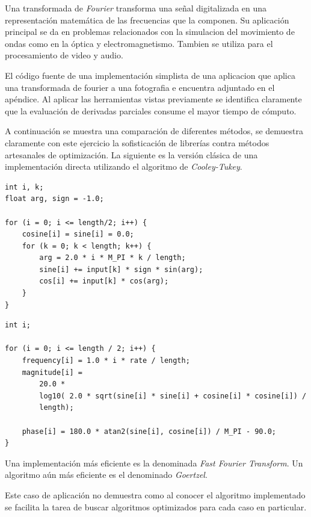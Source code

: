 \documentclass[a4paper]{report}
\begin{document}
Una transformada de {\it Fourier} \cite{fourier} transforma una se\~nal
digitalizada en una representaci\'on matem\'atica de las frecuencias que la
componen. Su aplicaci\'on principal se da en problemas relacionados con la simulacion del
movimiento de ondas como en la \'optica y electromagnetismo. Tambien se utiliza para el procesamiento de video y audio.

\bigskip

El c\'odigo fuente de una implementaci\'on simplista de una aplicacion que aplica una transformada de fourier a una fotografia 
e encuentra adjuntado en el ap\'endice. Al aplicar las herramientas vistas previamente se identifica
claramente que la evaluaci\'on de derivadas parciales consume el mayor tiempo
de c\'omputo.

\bigskip

A continuaci\'on se muestra una comparaci\'on de diferentes m\'etodos, se
demuestra claramente con este ejercicio la sofisticaci\'on de librer\'ias
contra m\'etodos artesanales de optimizaci\'on. La siguiente es la versi\'on
cl\'asica de una implementaci\'on directa utilizando el algoritmo de
{\it Cooley-Tukey}.

\begin{verbatim}
int i, k;
float arg, sign = -1.0;

for (i = 0; i <= length/2; i++) {
    cosine[i] = sine[i] = 0.0;
    for (k = 0; k < length; k++) {
        arg = 2.0 * i * M_PI * k / length;
        sine[i] += input[k] * sign * sin(arg);
        cos[i] += input[k] * cos(arg);
    }
}
\end{verbatim}

\begin{verbatim}
int i;

for (i = 0; i <= length / 2; i++) {
    frequency[i] = 1.0 * i * rate / length;
    magnitude[i] =
        20.0 *
        log10( 2.0 * sqrt(sine[i] * sine[i] + cosine[i] * cosine[i]) /
        length);

    phase[i] = 180.0 * atan2(sine[i], cosine[i]) / M_PI - 90.0;
}
\end{verbatim}

Una implementaci\'on m\'as eficiente es la denominada {\it Fast Fourier Transform}.
Un algoritmo a\'un m\'as eficiente es el denominado {\it Goertzel}.

\bigskip

Este caso de aplicaci\'on no demuestra como al conocer el algoritmo implementado se
facilita la tarea de buscar algoritmos optimizados para cada caso en particular.
\end{document}
